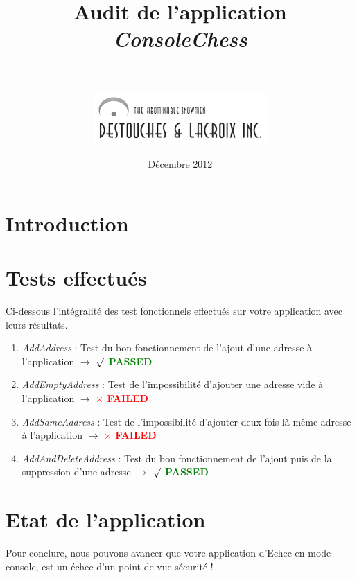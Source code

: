 \documentclass{article}
\title{Audit de l'application \textit{ConsoleChess} \\ --}
\author{   \includegraphics{UberLogo}}
\date{Décembre 2012}
\begin{document}
\begin{titlepage}
\pagestyle{fancy}

  	\maketitle
  	\tableofcontents
\end{titlepage}

\newpage
\section{Introduction}



\section{Tests effectués}
Ci-dessous l'intégralité des test fonctionnels effectués sur votre application avec leurs résultats.

\begin{enumerate}
\item \textit{AddAddress} : Test du bon fonctionnement de l'ajout d'une adresse à l'application $\rightarrow$ \textbf{\textcolor{green}{$\surd$ PASSED}}
\item \textit{AddEmptyAddress} : Test de l'impossibilité d'ajouter une adresse vide à l'application $\rightarrow$ \textbf{\textcolor{red}{$\times$ FAILED}}
\item \textit{AddSameAddress} : Test de l'impossibilité d'ajouter deux fois là même adresse à l'application $\rightarrow$ \textbf{\textcolor{red}{$\times$ FAILED}}
\item \textit{AddAndDeleteAddress} :  Test du bon fonctionnement de l'ajout puis de la suppression d'une adresse $\rightarrow$ \textbf{\textcolor{green}{$\surd$ PASSED}}
\end{enumerate}

\section{Etat de l'application}


Pour conclure, nous pouvons avancer que votre application d'Echec en mode console, est un échec d'un point de vue sécurité !

\renewcommand{\footrulewidth}{0.4pt}
\cfoot{ }
\end{document}
